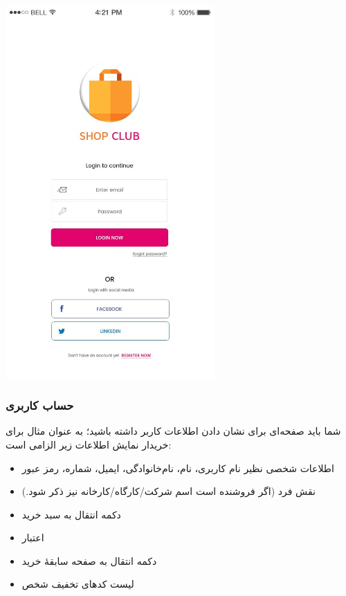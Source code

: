 \documentclass[]{article}
\begin{document}
\begin{center}
\includegraphics[width=0.6\textwidth]{images/image8.png}
\end{center}


\newpage


\subsubsection*{{\titr حساب کاربری}}

شما باید صفحه‌ای برای نشان دادن اطلاعات کاربر داشته باشید؛ به عنوان مثال برای خریدار نمایش اطلاعات زیر الزامی است:

\begin{itemize}
\item
اطلاعات شخصی نظیر نام کاربری، نام، نام‌خانوادگی، ایمیل، شماره، رمز عبور

\item
نقش فرد (اگر فروشنده است اسم شرکت/کارگاه/کارخانه نیز ذکر شود.)

\item
دکمه انتقال به سبد خرید

\item
اعتبار

\item
دکمه‌ انتقال به صفحه سابقهٔ خرید

\item
لیست کدهای تخفیف شخص




\end{itemize}
\end{document}
